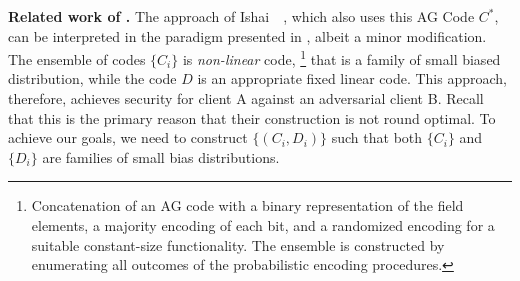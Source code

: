 \noindent\textbf{Related work of \cite{FOCS:IKOS09}.} 
The approach of Ishai~\etal~\cite{FOCS:IKOS09}, which also uses this AG Code $C^*$, can be interpreted in the paradigm presented in , albeit a minor modification. 
The ensemble of codes $\{C_i\}$ is {\em non-linear} code,%
\footnote{
	Concatenation of an AG code with a binary representation of the field elements, a majority encoding of each bit, and a randomized encoding for a suitable constant-size functionality. 
	The ensemble is constructed by enumerating all outcomes of the probabilistic encoding procedures.  
}
that is a family of small biased distribution, while the code $D$ is an appropriate fixed linear code. 
This approach, therefore, achieves security for client A against an adversarial client B. 
Recall that this is the primary reason that their construction is not round optimal. 
To achieve our goals, {we need to construct $\{(C_i, D_i)\}$ such that both $\{C_i\}$ and $\{D_i\}$ are families of small bias distributions.}  